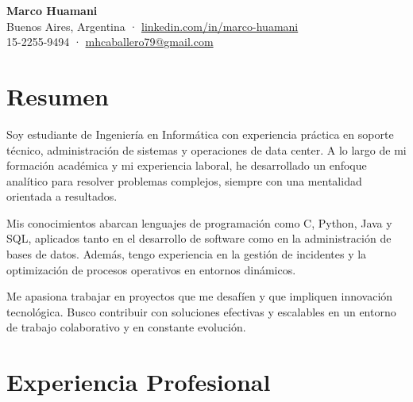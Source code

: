 \documentclass[a4paper,10pt]{article}
\begin{document}
\begin{center}
	\textbf{\Huge Marco Huamani} \\
	\vspace{0.2cm}
	Buenos Aires, Argentina · \href{https://www.linkedin.com/in/marco-huamani}{linkedin.com/in/marco-huamani} \\
	15-2255-9494 · \href{mailto:mhcaballero79@gmail.com}{mhcaballero79@gmail.com}
\end{center}

\vspace{0.5cm}

\section*{Resumen}
Soy estudiante de Ingeniería en Informática con experiencia práctica en soporte técnico, administración de sistemas y operaciones de data center. A lo largo de mi formación académica y mi experiencia laboral, he desarrollado un enfoque analítico para resolver problemas complejos, siempre con una mentalidad orientada a resultados.

Mis conocimientos abarcan lenguajes de programación como C, Python, Java y SQL, aplicados tanto en el desarrollo de software como en la administración de bases de datos. Además, tengo experiencia en la gestión de incidentes y la optimización de procesos operativos en entornos dinámicos.

Me apasiona trabajar en proyectos que me desafíen y que impliquen innovación tecnológica. Busco contribuir con soluciones efectivas y escalables en un entorno de trabajo colaborativo y en constante evolución.

\vspace{0.5cm}

\section*{Experiencia Profesional}
\end{document}
